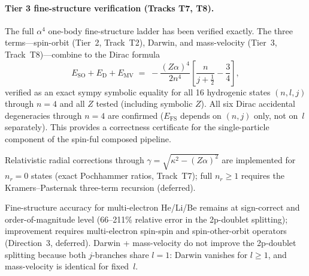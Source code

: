 
\paragraph{Tier 3 fine-structure verification (Tracks T7, T8).}
The full $\alpha^4$ one-body fine-structure ladder has been verified
exactly.  The three terms---spin-orbit (Tier~2, Track~T2), Darwin, and
mass-velocity (Tier~3, Track~T8)---combine to the Dirac formula
\begin{equation}\label{eq:dirac_fs}
  E_{\mathrm{SO}} + E_{\mathrm{D}} + E_{\mathrm{MV}}
  \;=\; -\frac{(Z\alpha)^4}{2n^4}\left[\frac{n}{j+\tfrac{1}{2}}
        - \frac{3}{4}\right],
\end{equation}
verified as an exact sympy symbolic equality for all 16 hydrogenic
states $(n,l,j)$ through $n = 4$ and all $Z$ tested (including symbolic
$Z$).  All six Dirac accidental degeneracies through $n = 4$ are
confirmed ($E_{\mathrm{FS}}$ depends on $(n,j)$ only, not on~$l$
separately).  This provides a correctness certificate for the
single-particle component of the spin-ful composed pipeline.

Relativistic radial corrections through $\gamma = \sqrt{\kappa^2 -
(Z\alpha)^2}$ are implemented for $n_r = 0$ states (exact Pochhammer
ratios, Track~T7); full $n_r \geq 1$ requires the Kramers--Pasternak
three-term recursion (deferred).

Fine-structure accuracy for multi-electron He/Li/Be remains at
sign-correct and order-of-magnitude level (66--211\% relative error
in the 2p-doublet splitting); improvement requires multi-electron
spin-spin and spin-other-orbit operators (Direction~3, deferred).
Darwin + mass-velocity do not improve the 2p-doublet splitting
because both $j$-branches share $l = 1$: Darwin vanishes for $l \geq 1$,
and mass-velocity is identical for fixed~$l$.
